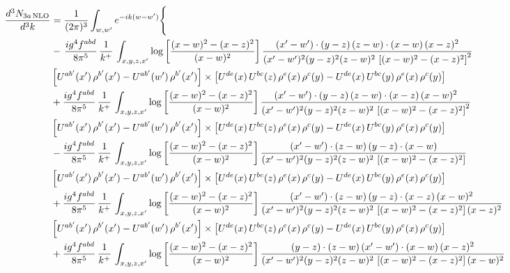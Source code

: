\documentclass[10pt]{article}
\begin{document}
{\begin{align*}
\end{align*}
\begin{align*}
\frac{d^{3}N_{3a\,\rm NLO}}{d^{3}k} & = \frac{1}{(2\pi)^{3}}\int_{w,w'}e^{-ik(w-w')}\Bigg\{\notag \\
& -\,\frac{ig^{4}f^{abd}}{8\pi^{5}}\,\frac{1}{k^{+}}\,\int_{x,y,z,x'}\log{\left[\frac{(x-w)^{2}-(x-z)^{2}}{(x-w)^{2}}\right]}\,
\frac{(x'-w')\cdot(y-z)\,(z-w)\cdot(x-w)\,(x-z)^{2}}{(x'-w')^{2}(y-z)^{2}(z-w)^{2}\,\left[(x-w)^{2}-(x-z)^{2}\right]^{2}}\notag \\ & \left[U^{ab'}(x')\,\rho^{b'}(x')-U^{ab'}(w')\, \rho^{b'}(x')\right]\times \left[U^{de}(x)\,U^{bc}(z)\, \rho^{e}(x)\,\rho^{c}(y)-U^{de}(x)\,U^{bc}(y)\,\rho^{e}(x)\,\rho^{c}(y)\right] \notag \\
& +\frac{ig^{4}f^{abd}}{8\pi^{5}}\,\frac{1}{k^{+}}\,\int_{x,y,z,x'}\log{\left[\frac{(x-w)^{2}-(x-z)^{2}}{(x-w)^{2}}\right]}\,
\frac{(x'-w')\cdot(y-z)\,(z-w)\cdot(x-z)\,(x-w)^{2}}{(x'-w')^{2}(y-z)^{2}(z-w)^{2}\,\left[(x-w)^{2}-(x-z)^{2}\right]^{2}}\notag \\ 
&\left[U^{ab'}(x')\,\rho^{b'}(x')-U^{ab'}(w')\, \rho^{b'}(x')\right]\times \left[U^{de}(x)\,U^{bc}(z)\, \rho^{e}(x)\,\rho^{c}(y)-U^{de}(x)\,U^{bc}(y)\,\rho^{e}(x)\,\rho^{c}(y)\right] \notag \\
& -\frac{ig^{4}f^{abd}}{8\pi^{5}}\,\frac{1}{k^{+}}\,\int_{x,y,z,x'}\log{\left[\frac{(x-w)^{2}-(x-z)^{2}}{(x-w)^{2}}\right]}\,
\frac{(x'-w')\cdot(z-w)\,(y-z)\cdot(x-w)}{(x'-w')^{2}(y-z)^{2}(z-w)^{2}\,\left[(x-w)^{2}-(x-z)^{2}\right]}\notag \\ & \left[U^{ab'}(x')\,\rho^{b'}(x')-U^{ab'}(w')\, \rho^{b'}(x')\right]\times \left[U^{de}(x)\,U^{bc}(z)\, \rho^{e}(x)\,\rho^{c}(y)-U^{de}(x)\,U^{bc}(y)\,\rho^{e}(x)\,\rho^{c}(y)\right] \notag \\
&  +\frac{ig^{4}f^{abd}}{8\pi^{5}}\,\frac{1}{k^{+}}\,\int_{x,y,z,x'}\log{\left[\frac{(x-w)^{2}-(x-z)^{2}}{(x-w)^{2}}\right]}\,
\frac{(x'-w')\cdot(z-w)\,(y-z)\cdot(x-z)\,(x-w)^{2}}{(x'-w')^{2}(y-z)^{2}(z-w)^{2}\,\left[(x-w)^{2}-(x-z)^{2}\right](x-z)^{2}}\notag \\ & \left[U^{ab'}(x')\,\rho^{b'}(x')-U^{ab'}(w')\, \rho^{b'}(x')\right]\times \left[U^{de}(x)\,U^{bc}(z)\, \rho^{e}(x)\,\rho^{c}(y)-U^{de}(x)\,U^{bc}(y)\,\rho^{e}(x)\,\rho^{c}(y)\right] \notag \\
& +\frac{ig^{4}f^{abd}}{8\pi^{5}}\,\frac{1}{k^{+}}\,\int_{x,y,z,x'}\log{\left[\frac{(x-w)^{2}-(x-z)^{2}}{(x-w)^{2}}\right]}\,
\frac{(y-z)\cdot(z-w)\,(x'-w')\cdot(x-w)\,(x-z)^{2}}{(x'-w')^{2}(y-z)^{2}(z-w)^{2}\,\left[(x-w)^{2}-(x-z)^{2}\right](x-w)^{2}}\notag \\ 

\end{align*}}
\end{document}
